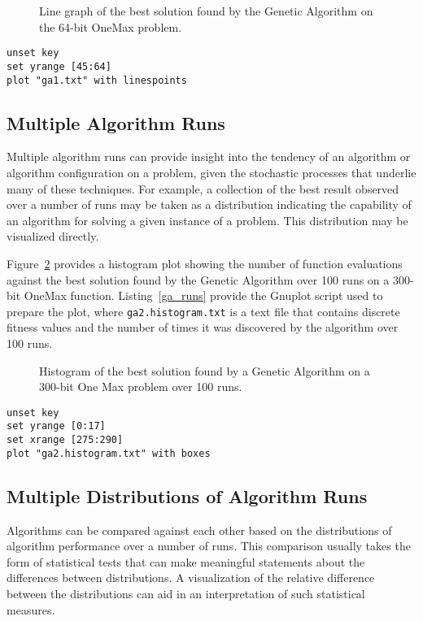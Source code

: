 \documentclass[a4paper, 11pt]{article}
\begin{document}
\begin{figure}[htp]

\caption{Line graph of the best solution found by the Genetic Algorithm on the 64-bit OneMax problem.}
\label{plot:ga1}
\end{figure}

\begin{lstlisting}[caption=Gnuplot script for creating a line graph of algorithm performance over time., label=ga_performance]
unset key
set yrange [45:64]
plot "ga1.txt" with linespoints
\end{lstlisting}

\subsection{Multiple Algorithm Runs}
Multiple algorithm runs can provide insight into the tendency of an algorithm or algorithm configuration on a problem, given the stochastic processes that underlie many of these techniques. For example, a collection of the best result observed over a number of runs may be taken as a distribution indicating the capability of an algorithm for solving a given instance of a problem. This distribution may be visualized directly. 

Figure~\ref{plot:ga2} provides a histogram plot showing the number of function evaluations against the best solution found by the Genetic Algorithm over 100 runs on a 300-bit OneMax function. Listing~\ref{ga_runs} provide the Gnuplot script used to prepare the plot, where \texttt{ga2.histogram.txt} is a text file that contains discrete fitness values and the number of times it was discovered by the algorithm over 100 runs.

\begin{figure}[htp]

\caption{Histogram of the best solution found by a Genetic Algorithm on a 300-bit One Max problem over 100 runs.}
\label{plot:ga2}
\end{figure}

\begin{lstlisting}[caption=Gnuplot script for creating a histogram of algorithm performance from multiple runs., label=ga_runs]
unset key
set yrange [0:17]
set xrange [275:290]
plot "ga2.histogram.txt" with boxes
\end{lstlisting}

\subsection{Multiple Distributions of Algorithm Runs}
Algorithms can be compared against each other based on the distributions of algorithm performance over a number of runs. This comparison usually takes the form of statistical tests that can make meaningful statements about the differences between distributions. A visualization of the relative difference between the distributions can aid in an interpretation of such statistical measures. 
\end{document}
